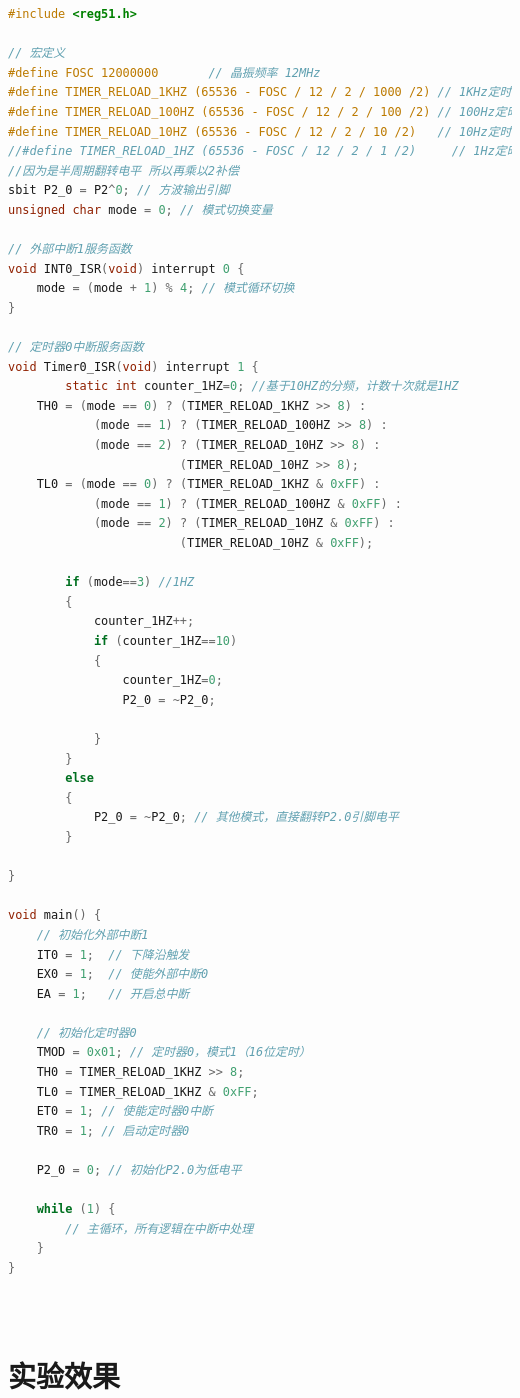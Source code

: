\documentclass[12pt,hyperref,a4paper,UTF8]{ctexart}
\begin{document}
\begin{lstlisting}[language=C, caption={实验程序}]
#include <reg51.h>

// 宏定义
#define FOSC 12000000       // 晶振频率 12MHz
#define TIMER_RELOAD_1KHZ (65536 - FOSC / 12 / 2 / 1000 /2) // 1KHz定时器初值 因为是半周期
#define TIMER_RELOAD_100HZ (65536 - FOSC / 12 / 2 / 100 /2) // 100Hz定时器初值
#define TIMER_RELOAD_10HZ (65536 - FOSC / 12 / 2 / 10 /2)   // 10Hz定时器初值
//#define TIMER_RELOAD_1HZ (65536 - FOSC / 12 / 2 / 1 /2)     // 1Hz定时器初值 250,000超出范围了
//因为是半周期翻转电平 所以再乘以2补偿
sbit P2_0 = P2^0; // 方波输出引脚
unsigned char mode = 0; // 模式切换变量

// 外部中断1服务函数
void INT0_ISR(void) interrupt 0 {
    mode = (mode + 1) % 4; // 模式循环切换
}

// 定时器0中断服务函数
void Timer0_ISR(void) interrupt 1 {
        static int counter_1HZ=0; //基于10HZ的分频，计数十次就是1HZ
    TH0 = (mode == 0) ? (TIMER_RELOAD_1KHZ >> 8) :
            (mode == 1) ? (TIMER_RELOAD_100HZ >> 8) :
            (mode == 2) ? (TIMER_RELOAD_10HZ >> 8) :
                        (TIMER_RELOAD_10HZ >> 8);
    TL0 = (mode == 0) ? (TIMER_RELOAD_1KHZ & 0xFF) :
            (mode == 1) ? (TIMER_RELOAD_100HZ & 0xFF) :
            (mode == 2) ? (TIMER_RELOAD_10HZ & 0xFF) :
                        (TIMER_RELOAD_10HZ & 0xFF);
    
        if (mode==3) //1HZ
        {
            counter_1HZ++;
            if (counter_1HZ==10)
            {
                counter_1HZ=0;
                P2_0 = ~P2_0;
                
            }
        }
        else
        {
            P2_0 = ~P2_0; // 其他模式，直接翻转P2.0引脚电平
        }
    
}

void main() {
    // 初始化外部中断1
    IT0 = 1;  // 下降沿触发
    EX0 = 1;  // 使能外部中断0
    EA = 1;   // 开启总中断

    // 初始化定时器0
    TMOD = 0x01; // 定时器0，模式1（16位定时）
    TH0 = TIMER_RELOAD_1KHZ >> 8;
    TL0 = TIMER_RELOAD_1KHZ & 0xFF;
    ET0 = 1; // 使能定时器0中断
    TR0 = 1; // 启动定时器0

    P2_0 = 0; // 初始化P2.0为低电平

    while (1) {
        // 主循环，所有逻辑在中断中处理
    }
}
   
    
\end{lstlisting}

\section{实验效果}
\end{document}
